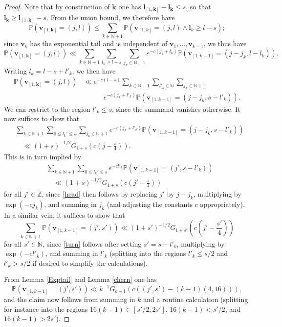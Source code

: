 \documentclass[12pt,a4paper,reqno]{amsart}
\numberwithin{equation}{section}
\theoremstyle{plain}
\theoremstyle{definition}
\renewcommand\P{\mathbb{P}}
\newcommand\Z{\mathbb{Z}}
\newcommand\N{\mathbb{N}}
\renewcommand\k{\mathbf{k}}
\renewcommand\v{\mathbf{v}}
\renewcommand\l{\mathbf{l}}
\begin{document}
\begin{proof}  Note that by construction of $\k$ one has $\l_{[1,\k]} - \l_\k \leq s$, so that $\l_\k \geq \l_{[1,\k]}-s$.  From the union bound, we therefore have
$$ \P( \v_{[1,\k]} = (j,l) ) \leq \sum_{k \in \N+1} \P( \v_{[1,k]} = (j,l) \wedge \l_k \geq l - s );$$
since $\v_k$ has the exponential tail and is independent of $\v_1,\dots,\v_{k-1}$, we thus have
$$ \P( \v_{[1,\k]} = (j,l) ) \ll \sum_{k \in \N+1} \sum_{l_k \geq l-s} \sum_{j_k \in \N+1} e^{- c(j_k+l_k)} \P( \v_{[1,k-1]} = (j-j_k,l-l_k) ).$$
Writing $l_k = l - s + l'_k$, we then have
\begin{align*}
\P( \v_{[1,\k]} = (j,l) ) &\ll e^{-c(l-s)} \sum_{k \in \N+1} \sum_{l'_k \in \N} \sum_{j_k \in \N+1} \\
&\quad\quad\quad e^{-c(j_k+l'_k)} \P( \v_{[1,k-1]} = (j-j_k,s-l'_k) ).
\end{align*}
We can restrict to the region $l'_k \leq s$, since the summand vanishes otherwise.  It now suffices to show that
\begin{equation}\label{head}
\begin{split}
&\sum_{k \in \N+1} \sum_{0 \leq l_k' \leq s} \sum_{j_k \in \N+1} e^{- c(j_k+l'_k)} \P\left( \v_{[1,k-1]} = (j-j_k,s-l'_k) \right)\\
&\quad \ll (1+s)^{-1/2} G_{1+s}\left( c(j - \frac{s}{4}) \right).
\end{split}
\end{equation}
This is in turn implied by 
\begin{equation}\label{turn}
\begin{split}
&\sum_{k \in \N+1} \sum_{0 \leq l_k' \leq s} e^{-cl'_k} \P( \v_{[1,k-1]} = (j',s-l'_k) ) \\
&\quad \ll (1+s)^{-1/2} G_{1+s}\left( c(j' - \frac{s}{4}) \right)
\end{split}
\end{equation}
for all $j' \in \Z$, since \eqref{head} then follows by replacing $j'$ by $j - j_k$, multiplying by $\exp(-cj_k)$, and summing in $j_k$ (and adjusting the constants $c$ appropriately).  In a similar vein, it suffices to show that
$$\sum_{k \in \N+1} \P( \v_{[1,k-1]} = (j',s') ) \ll (1+s')^{-1/2} G_{1+s'}\left( c(j' - \frac{s'}{4}) \right)$$
for all $s' \in \N$, since \eqref{turn} follows after setting $s' = s - l'_k$, multiplying by $\exp(-cl'_k)$, and summing in $l'_k$ (splitting into the regions $l'_k \leq s/2$ and $l'_k > s/2$ if desired to simplify the calculations).

From Lemma \ref{Exptail} and Lemma \ref{chern} one has
$$ \P( \v_{[1,k-1]} = (j',s') ) \ll k^{-1} G_{k-1}\left( c ((j',s') - (k-1)(4,16))\right),$$
and the claim now follows from summing in $k$ and a routine calculation (splitting for instance into the regions $16 (k-1) \in [s'/2,2s']$, $16(k-1) < s'/2$, and $16(k-1)>2s'$).
\end{proof}
\end{document}
